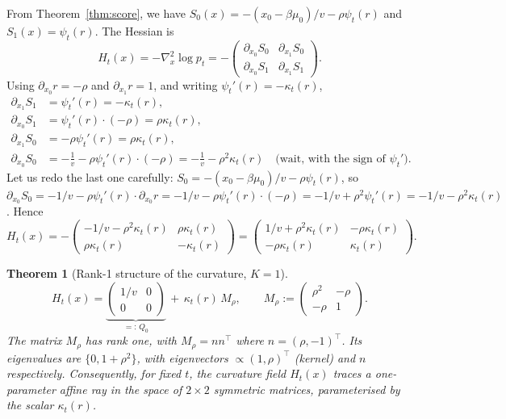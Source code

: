 \documentclass[11pt,a4paper,openany]{book}
\theoremstyle{plainserif}
\newtheorem{theorem}{Theorem}[chapter]
\theoremstyle{definition}
\theoremstyle{remarkstyle}
\begin{document}
From Theorem~\ref{thm:score}, we have
$S_0(x) = -(x_0-\beta\mu_0)/v - \rho\psi_t(r)$
and $S_1(x) = \psi_t(r)$. The Hessian is
\begin{equation}
H_t(x) = -\nabla_x^2 \log p_t = -\begin{pmatrix} \partial_{x_0} S_0 & \partial_{x_1} S_0 \\
                                                   \partial_{x_0} S_1 & \partial_{x_1} S_1 \end{pmatrix}.
\end{equation}
Using $\partial_{x_0} r = -\rho$ and $\partial_{x_1} r = 1$, and writing
$\psi_t'(r) = -\kappa_t(r)$,
\begin{align}
\partial_{x_1} S_1 &= \psi_t'(r) = -\kappa_t(r), \\
\partial_{x_0} S_1 &= \psi_t'(r)\cdot(-\rho) = \rho\kappa_t(r), \\
\partial_{x_1} S_0 &= -\rho\psi_t'(r) = \rho\kappa_t(r), \\
\partial_{x_0} S_0 &= -\frac{1}{v} - \rho\psi_t'(r)\cdot(-\rho) = -\frac{1}{v} - \rho^2 \kappa_t(r)
   \quad \text{(wait, with the sign of }\psi_t').
\end{align}
Let us redo the last one carefully:
$S_0 = -(x_0-\beta\mu_0)/v - \rho\psi_t(r)$, so
$\partial_{x_0} S_0 = -1/v - \rho \psi_t'(r)\cdot \partial_{x_0} r
                    = -1/v - \rho \psi_t'(r)\cdot(-\rho)
                    = -1/v + \rho^2 \psi_t'(r)
                    = -1/v - \rho^2 \kappa_t(r)$.
Hence
\begin{equation}
H_t(x) = -\begin{pmatrix} -1/v - \rho^2\kappa_t(r) & \rho\kappa_t(r) \\
                          \rho\kappa_t(r) & -\kappa_t(r) \end{pmatrix}
       = \begin{pmatrix} 1/v + \rho^2\kappa_t(r) & -\rho\kappa_t(r) \\
                          -\rho\kappa_t(r) & \kappa_t(r) \end{pmatrix}.
\label{eq:H-explicit}
\end{equation}

\begin{theorem}[Rank-1 structure of the curvature, $K{=}1$]
\label{thm:curv}
\begin{equation}
H_t(x) = \underbrace{\begin{pmatrix}1/v & 0\\0 & 0\end{pmatrix}}_{=:\, Q_0}
       \,+\, \kappa_t(r)\, M_\rho,\qquad
M_\rho := \begin{pmatrix}\rho^2 & -\rho\\ -\rho & 1\end{pmatrix}.
\label{eq:H-ray}
\end{equation}
The matrix $M_\rho$ has rank one, with $M_\rho = nn^\top$ where
$n = (\rho, -1)^\top$. Its eigenvalues are $\{0, 1+\rho^2\}$, with
eigenvectors $\propto (1,\rho)^\top$ (kernel) and $n$ respectively.
Consequently, for fixed $t$, the curvature field $H_t(x)$ traces a
one-parameter affine ray in the space of $2\times 2$ symmetric matrices,
parameterised by the scalar $\kappa_t(r)$.
\end{theorem}
\end{document}
